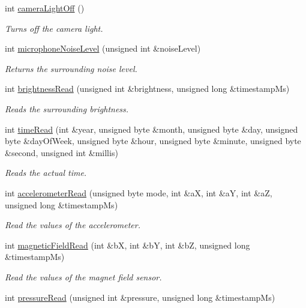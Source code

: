 \begin{DoxyCompactItemize}
int \hyperlink{robot_sensors_8nxc_ae014642216a8b0fd3317ea010d9402bc}{camera\-Light\-Off} ()
\begin{DoxyCompactList}\small\item\em Turns off the camera light. \end{DoxyCompactList}\item 
int \hyperlink{robot_sensors_8nxc_afd0b86d4fb70505c911d62f6713c28a0}{microphone\-Noise\-Level} (unsigned int \&noise\-Level)
\begin{DoxyCompactList}\small\item\em Returns the surrounding noise level. \end{DoxyCompactList}\item 
int \hyperlink{robot_sensors_8nxc_a4c2f735e14a76a51a671d57f05e5d502}{brightness\-Read} (unsigned int \&brightness, unsigned long \&timestamp\-Ms)
\begin{DoxyCompactList}\small\item\em Reads the surrounding brightness. \end{DoxyCompactList}\item 
int \hyperlink{robot_sensors_8nxc_a693876b8dfa170ce4da309acdea1e0a5}{time\-Read} (int \&year, unsigned byte \&month, unsigned byte \&day, unsigned byte \&day\-Of\-Week, unsigned byte \&hour, unsigned byte \&minute, unsigned byte \&second, unsigned int \&millis)
\begin{DoxyCompactList}\small\item\em Reads the actual time. \end{DoxyCompactList}\item 
int \hyperlink{robot_sensors_8nxc_a41e4b4d78995b9b52d8dd6923adef671}{accelerometer\-Read} (unsigned byte mode, int \&a\-X, int \&a\-Y, int \&a\-Z, unsigned long \&timestamp\-Ms)
\begin{DoxyCompactList}\small\item\em Read the values of the accelerometer. \end{DoxyCompactList}\item 
int \hyperlink{robot_sensors_8nxc_a236fd33f24d9200616192ce5646abad0}{magnetic\-Field\-Read} (int \&b\-X, int \&b\-Y, int \&b\-Z, unsigned long \&timestamp\-Ms)
\begin{DoxyCompactList}\small\item\em Read the values of the magnet field sensor. \end{DoxyCompactList}\item 
int \hyperlink{robot_sensors_8nxc_aa09fd0ec125c68b2179d23be463f110f}{pressure\-Read} (unsigned int \&pressure, unsigned long \&timestamp\-Ms)

\end{DoxyCompactItemize}

